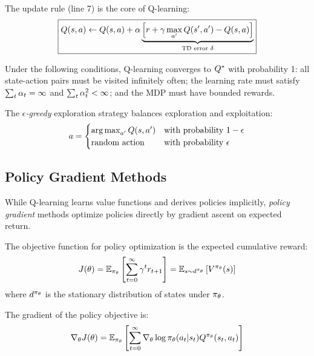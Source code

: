 The update rule (line 7) is the core of Q-learning:
\begin{equation}
\boxed{Q(s,a) \leftarrow Q(s,a) + \alpha \underbrace{\left[ r + \gamma \max_{a'} Q(s',a') - Q(s,a) \right]}_{\text{TD error } \delta}}
\label{eq:qlearning_update}
\end{equation}

\begin{theorem}
Under the following conditions, Q-learning converges to $Q^*$ with probability 1: all state-action pairs must be visited infinitely often; the learning rate must satisfy $\sum_t \alpha_t = \infty$ and $\sum_t \alpha_t^2 < \infty$; and the MDP must have bounded rewards.
\end{theorem}

The \textit{$\epsilon$-greedy} exploration strategy balances exploration and exploitation:
\begin{equation}
a = \begin{cases}
\operatorname*{arg\,max}_{a'} Q(s, a') & \text{with probability } 1 - \epsilon \\
\text{random action} & \text{with probability } \epsilon
\end{cases}
\end{equation}

\subsection{Policy Gradient Methods}

While Q-learning learns value functions and derives policies implicitly, \textit{policy gradient} methods optimize policies directly by gradient ascent on expected return.

\begin{definition}
The objective function for policy optimization is the expected cumulative reward:
\begin{equation}
J(\theta) = \mathbb{E}_{\pi_\theta} \left[ \sum_{t=0}^{\infty} \gamma^t r_{t+1} \right] = \mathbb{E}_{s \sim d^{\pi_\theta}} \left[ V^{\pi_\theta}(s) \right]
\label{eq:policy_objective}
\end{equation}
where $d^{\pi_\theta}$ is the stationary distribution of states under $\pi_\theta$.
\end{definition}

\begin{theorem}
The gradient of the policy objective is:
\begin{equation}
\nabla_\theta J(\theta) = \mathbb{E}_{\pi_\theta} \left[ \sum_{t=0}^{\infty} \nabla_\theta \log \pi_\theta(a_t|s_t) Q^{\pi_\theta}(s_t, a_t) \right]
\label{eq:policy_gradient}
\end{equation}
\end{theorem}

